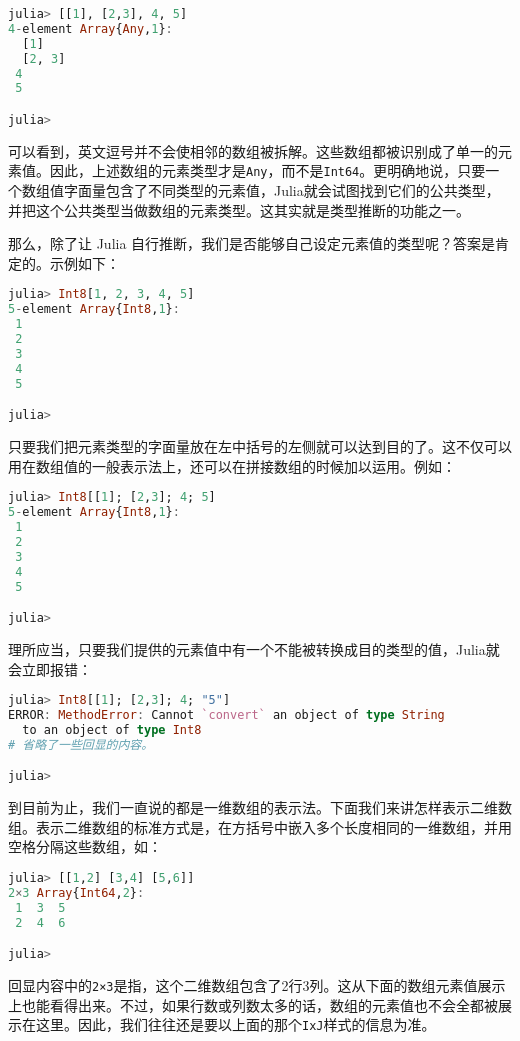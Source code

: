 \begin{lstlisting}[language=julia]
julia> [[1], [2,3], 4, 5]
4-element Array{Any,1}:
  [1]   
  [2, 3]
 4      
 5      

julia> 
\end{lstlisting}

可以看到，英文逗号并不会使相邻的数组被拆解。这些数组都被识别成了单一的元素值。因此，上述数组的元素类型才是\verb|Any|，而不是\verb|Int64|。更明确地说，只要一个数组值字面量包含了不同类型的元素值，Julia就会试图找到它们的公共类型，并把这个公共类型当做数组的元素类型。这其实就是类型推断的功能之一。

那么，除了让 Julia 自行推断，我们是否能够自己设定元素值的类型呢？答案是肯定的。示例如下：

\begin{lstlisting}[language=julia]
julia> Int8[1, 2, 3, 4, 5]
5-element Array{Int8,1}:
 1
 2
 3
 4
 5

julia> 
\end{lstlisting}

只要我们把元素类型的字面量放在左中括号的左侧就可以达到目的了。这不仅可以用在数组值的一般表示法上，还可以在拼接数组的时候加以运用。例如：

\begin{lstlisting}[language=julia]
julia> Int8[[1]; [2,3]; 4; 5]
5-element Array{Int8,1}:
 1
 2
 3
 4
 5

julia> 
\end{lstlisting}

理所应当，只要我们提供的元素值中有一个不能被转换成目的类型的值，Julia就会立即报错：

\begin{lstlisting}[language=julia]
julia> Int8[[1]; [2,3]; 4; "5"]
ERROR: MethodError: Cannot `convert` an object of type String 
  to an object of type Int8
# 省略了一些回显的内容。

julia> 
\end{lstlisting}

到目前为止，我们一直说的都是一维数组的表示法。下面我们来讲怎样表示二维数组。表示二维数组的标准方式是，在方括号中嵌入多个长度相同的一维数组，并用空格分隔这些数组，如：

\begin{lstlisting}[language=julia]
julia> [[1,2] [3,4] [5,6]]
2×3 Array{Int64,2}:
 1  3  5
 2  4  6

julia> 
\end{lstlisting}

回显内容中的\verb|2×3|是指，这个二维数组包含了2行3列。这从下面的数组元素值展示上也能看得出来。不过，如果行数或列数太多的话，数组的元素值也不会全都被展示在这里。因此，我们往往还是要以上面的那个\verb|IxJ|样式的信息为准。

